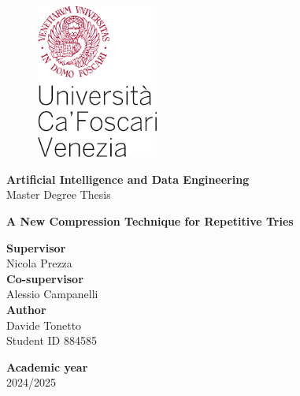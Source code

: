 \begin{titlepage}
\begin{figure}[!htb]
    \includegraphics[width=4cm]{Immagini/logo 2 unive.png}
\end{figure}

\begin{center}
    \vspace{13mm}
    \normalsize{\textbf{Artificial Intelligence and Data Engineering}}
    \vspace{13mm}
    \\ \normalsize{Master Degree Thesis}
\end{center}

\vspace{10mm}
\begin{center}
    \LARGE{\textbf{A New Compression Technique for Repetitive Tries}}
\end{center}

\vspace*{\fill}

\begin{minipage}[t]{1\textwidth}
    {\normalsize{\textbf{Supervisor}}{\normalsize\vspace{1mm}
    \\ \normalsize{Nicola Prezza }}} \\ 

    {\normalsize{\textbf{Co-supervisor}}{\normalsize\vspace{1mm}
    \\ \normalsize{Alessio Campanelli }}} \\ 
        
    {\normalsize{\textbf{Author}}{\normalsize\vspace{1mm}
    \\ \normalsize{Davide Tonetto}\\
    \normalsize{Student ID 884585 }}} \\
\end{minipage}

\begin{flushleft}
    {\normalsize{\textbf{Academic year}}{\normalsize\vspace{1mm}
    \\ \normalsize{2024/2025}}}  
\end{flushleft}

\end{titlepage}
